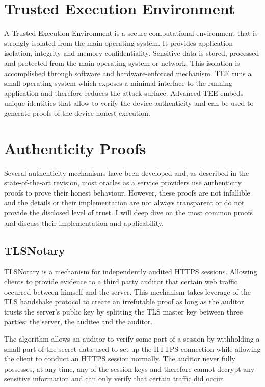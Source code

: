 \section{Trusted Execution Environment}
A Trusted Execution Environment is a secure computational environment that is strongly isolated from the main operating system. It provides application isolation, integrity and memory confidentiality. Sensitive data is stored, processed and protected from the main operating system or network. This isolation is accomplished through software and hardware-enforced mechanism. TEE runs a small operating system which exposes a minimal interface to the running application and therefore reduces the attack surface. Advanced TEE embeds unique identities that allow to verify the device authenticity and can be used to generate proofs of the device honest execution.

\section{Authenticity Proofs}

Several authenticity mechanisms have been developed and, as described in the state-of-the-art revision, most oracles as a service providers use authenticity proofs to prove their honest behaviour. However, these proofs are not infallible and the details or their implementation are not always transparent or do not provide the disclosed level of trust. I will deep dive on the most common proofs and discuss their implementation and applicability.
 
\subsection{TLSNotary}

TLSNotary is a mechanism for independently audited HTTPS sessions. Allowing clients to provide evidence to a third party auditor that certain web traffic occurred between himself and the server. This mechanism takes leverage of the TLS handshake protocol to create an irrefutable proof as long as the auditor trusts the server's public key by splitting the TLS master key between three parties: the server, the auditee and the auditor.

The algorithm allows an auditor to verify some part of a session by withholding a small part of the secret data used to set up the HTTPS connection while allowing the client to conduct an HTTPS session normally. The auditor never fully possesses, at any time, any of the session keys and therefore cannot decrypt any sensitive information and can only verify that certain traffic did occur.

